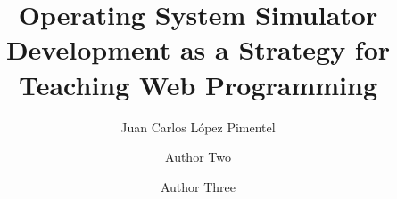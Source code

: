 \title{Operating System Simulator Development as a Strategy for Teaching Web Programming}


\author[label1,label2]{Juan Carlos L\'opez Pimentel}
\address[label1]{Address One}
\address[label2]{Address Two}



\author[label5]{Author Two}
\address[label5]{Some University}

\author[label1,label5]{Author Three}
